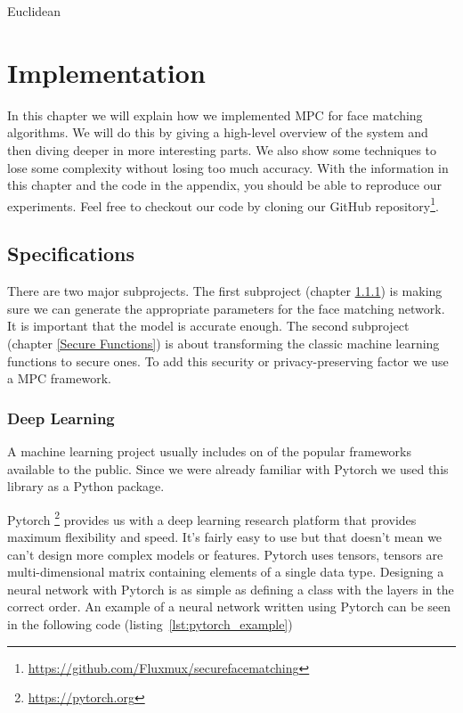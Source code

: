Euclidean%


\DeclarePairedDelimiter\floor{\lfloor}{\rfloor}

\chapter{Implementation}
In this chapter we will explain how we implemented MPC for face matching algorithms. We will do this by giving a high-level overview of the system and then diving deeper in more interesting parts. We also show some techniques to lose some complexity without losing too much accuracy. With the information in this chapter and the code in the appendix, you should be able to reproduce our experiments. Feel free to checkout our code by cloning our GitHub repository\footnote{\url{https://github.com/Fluxmux/securefacematching}}.

\section{Specifications}
There are two major subprojects. The first subproject (chapter \ref{Deep Learning}) is making sure we can generate the appropriate parameters for the face matching network. It is important that the model is accurate enough. The second subproject (chapter \ref{Secure Functions}) is about transforming the classic machine learning functions to secure ones. To add this security or privacy-preserving factor we use a MPC framework.

\subsection{Deep Learning}
\label{Deep Learning}
A machine learning project usually includes on of the popular frameworks available to the public. Since we were already familiar with Pytorch we used this library as a Python package.

Pytorch \footnote{\url{https://pytorch.org}} provides us with a deep learning research platform that provides maximum flexibility and speed. It's fairly easy to use but that doesn't mean we can't design more complex models or features. Pytorch uses tensors, tensors are multi-dimensional matrix containing elements of a single data type. Designing a neural network with Pytorch is as simple as defining a class with the layers in the correct order. An example of a neural network written using Pytorch can be seen in the following code (listing~\ref{lst:pytorch_example})\\

